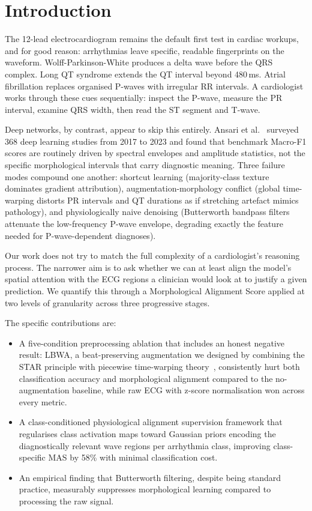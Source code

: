 \documentclass{article}
\begin{document}
\section{Introduction}

The 12-lead electrocardiogram remains the default first test in cardiac
workups, and for good reason: arrhythmias leave specific, readable
fingerprints on the waveform. Wolff-Parkinson-White produces a delta
wave before the QRS complex. Long QT syndrome extends the QT interval
beyond 480\,ms. Atrial fibrillation replaces organised P-waves with
irregular RR intervals. A cardiologist works through these cues
sequentially: inspect the P-wave, measure the PR interval, examine
QRS width, then read the ST segment and T-wave.

Deep networks, by contrast, appear to skip this entirely. Ansari et
al.~\cite{ansari2023} surveyed 368 deep learning studies from 2017 to
2023 and found that benchmark Macro-F1 scores are routinely driven by
spectral envelopes and amplitude statistics, not the specific
morphological intervals that carry diagnostic meaning. Three failure
modes compound one another: shortcut learning (majority-class texture
dominates gradient attribution), augmentation-morphology conflict
(global time-warping distorts PR intervals and QT durations as if
stretching artefact mimics pathology), and physiologically naive
denoising (Butterworth bandpass filters attenuate the low-frequency
P-wave envelope, degrading exactly the feature needed for
P-wave-dependent diagnoses).

Our work does not try to match the full complexity of a cardiologist's
reasoning process. The narrower aim is to ask whether we can at least
align the model's spatial attention with the ECG regions a clinician
would look at to justify a given prediction. We quantify this through
a Morphological Alignment Score applied at two levels of granularity
across three progressive stages.

The specific contributions are:
\begin{itemize}
  \item A five-condition preprocessing ablation that includes an
    honest negative result: LBWA, a beat-preserving augmentation
    we designed by combining the STAR principle with piecewise
    time-warping theory~\cite{iwana2021}, consistently hurt both
    classification accuracy and morphological alignment compared
    to the no-augmentation baseline, while raw ECG with z-score
    normalisation won across every metric.
  \item A class-conditioned physiological alignment supervision
    framework that regularises class activation maps toward
    Gaussian priors encoding the diagnostically relevant wave
    regions per arrhythmia class, improving class-specific MAS
    by 58\% with minimal classification cost.
  \item An empirical finding that Butterworth filtering, despite
    being standard practice, measurably suppresses morphological
    learning compared to processing the raw signal.
\end{itemize}
\end{document}
